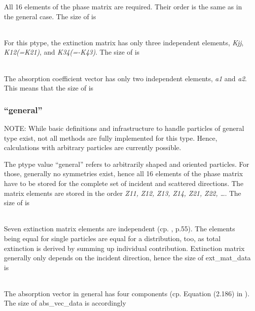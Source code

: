 All 16 elements of the phase matrix are required. Their order is the same as in
the general case. The size of  is

\\
For this ptype, the extinction matrix has only three independent elements, {\sl
Kjj}, {\sl K12(=K21)}, and {\sl K34(=-K43)}. The size of
 is

\shortcode{[N\_f N\_T N\_za/2+1 1 3]}\\
The absorption coefficient vector has only two independent elements, {\sl a1} and
{\sl a2}. This means that the size of  is 

\shortcode{[N\_f N\_T N\_za/2+1 1 2]}

\subsubsection{``general''}

NOTE: While basic definitions and infrastructure to handle particles of general
type exist, not all methods are fully implemented for this type. Hence,
calculations with arbitrary particles are currently possible.

The ptype value ``general'' refers to arbitrarily shaped and oriented particles.
For those, generally no symmetries exist, hence all 16 elements of
the phase matrix have to be stored for the complete set of incident and
scattered directions. The matrix elements are stored in the order {\sl Z11,
Z12, Z13, Z14, Z21, Z22, \dots}. The size of  is

\\
Seven extinction matrix elements are independent (cp. \citet{Mishchenko:02},
p.55). The elements being equal for single particles are equal for a
distribution, too, as total extinction is derived by summing up individual
contribution. Extinction matrix generally only depends on the incident
direction, hence the size of ext\_mat\_data is

\\
The absorption vector in general has four components (cp. Equation
(2.186) in \citet{Mishchenko:02}). The size of abs\_vec\_data is
accordingly



